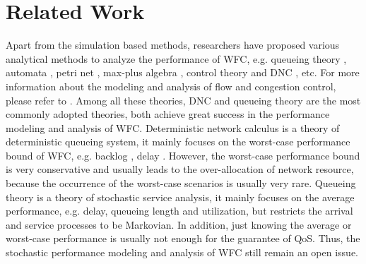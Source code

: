\documentclass[paper]{ieice}
\begin{document}
\section{Related Work}\label{relate}
Apart from the simulation based methods, researchers have proposed various analytical methods to analyze the performance of WFC, e.g. queueing theory \cite{1094531,Chu:1981:ATQ:1310158.1310656,berger1992impact,jung1996analysis,1095377,1092752,113869}, automata \cite{Billington:2007:FTD:1366708.1366712}, petri net \cite{Gaeta2003}, max-plus algebra \cite{BaHo00}, control theory \cite{wang2008internet} and DNC \cite{CrOk96,AgRa96,Chan98,ACOR99,QLDD09FC,bose2006analysis,Qian2010Analysis}, etc. For more information about the modeling and analysis of flow and congestion control, please refer to \cite{srikant2004mathematics}. Among all these theories, DNC and queueing theory are the most commonly adopted theories, both achieve great success in the performance modeling and analysis of WFC. Deterministic network calculus is a theory of deterministic queueing system, it mainly focuses on the worst-case performance bound of WFC, e.g. backlog \cite{QLDD09FC,bose2006analysis}, delay \cite{Qian2010Analysis}. However, the worst-case performance bound is very conservative and usually leads to the over-allocation of network resource, because the occurrence of the worst-case scenarios is usually very rare. Queueing theory is a theory of stochastic service analysis, it mainly focuses on the average performance, e.g. delay, queueing length and utilization, but restricts the arrival and service processes to be Markovian. In addition, just knowing the average or worst-case performance is usually not enough for the guarantee of QoS. Thus, the stochastic performance modeling and analysis of WFC still remain an open issue.
\end{document}
